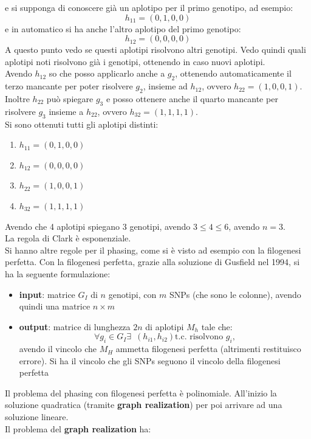 \documentclass[a4paper,12pt, oneside]{book}
\begin{document}
\begin{esempio}
  e si supponga di conoscere già un aplotipo per il primo genotipo, ad esempio:
  \[h_{11}=(0,1,0,0)\]
  e in automatico si ha anche l'altro aplotipo del primo genotipo:
  \[h_{12}=(0,0,0,0)\]
  A questo punto vedo se questi aplotipi risolvono altri genotipi. Vedo quindi
  quali aplotipi noti risolvono già i genotipi, ottenendo in caso nuovi
  aplotipi.\\
  Avendo $h_{12}$ so che posso applicarlo anche a $g_2$, ottenendo
  automaticamente il terzo
  mancante per poter risolvere $g_2$, insieme ad $h_{12}$, ovvero
  $h_{22}=(1,0,0,1)$. Inoltre $h_{22}$ 
  può spiegare $g_3$ e posso ottenere anche il quarto mancante per risolvere
  $g_3$ insieme a $h_{22}$, ovvero $h_{32}=(1,1,1,1)$.\\
  Si sono ottenuti tutti gli aplotipi distinti:
  \begin{enumerate}
    \item $h_{11}=(0,1,0,0)$
    \item $h_{12}=(0,0,0,0)$
    \item $h_{22}=(1,0,0,1)$
    \item $h_{32}=(1,1,1,1)$
  \end{enumerate}
  Avendo che 4 aplotipi spiegano 3 genotipi, avendo $3\leq 4 \leq 6$, avendo
  $n=3$.\\ 
  La regola di Clark è esponenziale. \\
  Si hanno altre regole per il phasing, come si è visto ad esempio con la
  filogenesi perfetta. Con la filogenesi perfetta, grazie alla soluzione di
  Gusfield nel 1994, si ha la seguente formulazione:
  \begin{itemize}
    \item \textbf{input}: matrice $G_I$ di $n$ genotipi, con $m$ SNPs (che sono
    le colonne), avendo
    quindi una matrice $n\times m$
    \item \textbf{output}: matrice di lunghezza $2n$ di aplotipi $M_h$ tale che:
    \[\forall g_i\in G_I\exists \,\,\, (h_{i1},h_{i2})\mbox{
        t.c. risolvono } g_i,\] avendo il vincolo che $M_H$ ammetta filogenesi
    perfetta (altrimenti restituisco errore). Si ha il vincolo che gli SNPs
    seguono il vincolo della filogenesi perfetta
  \end{itemize}
  Il problema del phasing con filogenesi perfetta è polinomiale. All'inizio la
  soluzione quadratica (tramite \textbf{graph realization}) per poi arrivare ad
  una soluzione lineare.  \\
  Il problema del \textbf{graph realization} ha:
  \begin{itemize}

\end{itemize}
\end{esempio}
\end{document}
